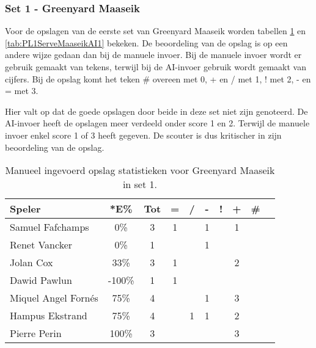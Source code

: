 \subsubsection{Set 1 - Greenyard Maaseik}
\label{sec:PL1_Greenyard1}
Voor de opslagen van de eerste set van Greenyard Maaseik worden tabellen \ref{tab:PL1ServeMaaseikMan1} en \ref{tab:PL1ServeMaaseikAI1} bekeken. De beoordeling van de opslag is op een andere wijze gedaan dan bij de manuele invoer. Bij de manuele invoer wordt er gebruik gemaakt van tekens, terwijl bij de AI-invoer gebruik wordt gemaakt van cijfers. Bij de opslag komt het teken \# overeen met 0, + en / met 1, ! met 2, - en = met 3.

Hier valt op dat de goede opslagen door beide in deze set niet zijn genoteerd. De AI-invoer heeft de opslagen meer verdeeld onder score 1 en 2. Terwijl de manuele invoer enkel score 1 of 3 heeft gegeven. De scouter is dus kritischer in zijn beoordeling van de opslag.

\begin{table}[ht!]
    \centering
    \scriptsize
    \begin{tabular}{|l|c|c|c|c|c|c|c|c|c|}
      \hline
      \textbf{Speler} & *E\% & Tot & = & / & - & ! & + & \# \\ \hline
      Samuel Fafchamps & 0\% & 3 & 1 &  & 1 &  & 1 &  \\ 
      Renet Vancker & 0\% & 1 &  &  & 1 &  &  &  \\ 
      Jolan Cox  & 33\% & 3 & 1 &  &  &  & 2 &  \\ 
      Dawid Pawlun  & -100\% & 1 & 1 &  &  &  &  &  \\ 
      Miquel Angel Fornés & 75\% & 4 &  &  & 1 &  & 3 &  \\
      Hampus Ekstrand & 75\% & 4 &  & 1 & 1 &  & 2 &  \\
      Pierre Perin & 100\% & 3 &  &  &  &  & 3 &  \\ \hline
    \end{tabular}
    \caption[Manueel ingevoerd opslag statistieken voor Greenyard Maaseik in set 1]{\label{tab:PL1ServeMaaseikMan1}Manueel ingevoerd opslag statistieken voor Greenyard Maaseik in set 1.}
\end{table}

